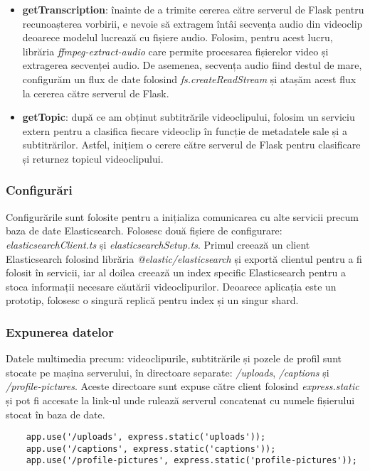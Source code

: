 \begin{itemize}
    \item \textbf{getTranscription}: înainte de a trimite cererea către serverul de Flask pentru 
    recunoașterea vorbirii, e nevoie să extragem întâi secvența audio din videoclip deoarece 
    modelul lucrează cu fișiere audio. Folosim, pentru acest lucru, librăria \textit{ffmpeg-extract-audio}
    care permite procesarea fișierelor video și extragerea secvenței audio. De asemenea, secvența
    audio fiind destul de mare, configurăm un flux de date folosind \textit{fs.createReadStream} și 
    atașăm acest flux la cererea către serverul de Flask.
    \item \textbf{getTopic}: după ce am obținut subtitrările videoclipului, folosim un serviciu
    extern pentru a clasifica fiecare videoclip în funcție de metadatele sale și a subtitrărilor.
    Astfel, inițiem o cerere către serverul de Flask pentru clasificare și returnez topicul videoclipului.
\end{itemize}

\subsubsection{Configurări}
Configurările sunt folosite pentru a inițializa comunicarea cu alte servicii precum baza de date
Elasticsearch. Folosesc două fișiere de configurare: \textit{elasticsearchClient.ts} și
\textit{elasticsearchSetup.ts}. Primul creează un client Elasticsearch folosind librăria
\textit{@elastic/elasticsearch} și exportă clientul pentru a fi folosit în servicii, iar al doilea
creează un index specific Elasticsearch pentru a stoca informații necesare căutării videoclipurilor.
Deoarece aplicația este un prototip, folosesc o singură replică pentru index și un singur shard.

\subsubsection{Expunerea datelor}
Datele multimedia precum: videoclipurile, subtitrările și pozele de profil sunt stocate 
pe mașina serverului, în directoare separate: \textit{/uploads}, \textit{/captions} și
\textit{/profile-pictures}. Aceste directoare sunt expuse către client folosind
\textit{express.static} și pot fi accesate la link-ul unde rulează serverul concatenat
cu numele fișierului stocat în baza de date.


\begin{verbatim}
    app.use('/uploads', express.static('uploads'));
    app.use('/captions', express.static('captions'));
    app.use('/profile-pictures', express.static('profile-pictures'));
\end{verbatim}

